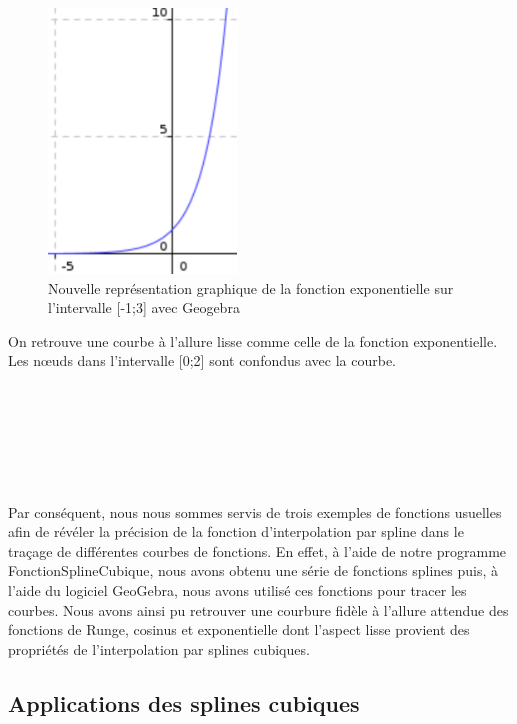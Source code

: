 \documentclass{article}
\begin{document}
\begin{figure}[h]
	\centering
	\includegraphics[width=5cm]{FonctionExponentielle.png}
	\caption{Nouvelle repr\'{e}sentation graphique de la fonction exponentielle sur l'intervalle [-1;3] avec Geogebra}
\end{figure}

\newpage

On retrouve une courbe \`a l'allure lisse comme celle de la fonction exponentielle. Les n\oe uds dans l'intervalle [0;2] sont confondus avec la courbe.\\\\\\\\\\\\\

Par cons\'{e}quent, nous nous sommes servis de trois exemples de fonctions usuelles afin de r\'{e}v\'{e}ler la pr\'{e}cision de la fonction d'interpolation par spline dans le tra\c cage de diff\'{e}rentes courbes de fonctions. En effet, \`a l'aide de notre programme FonctionSplineCubique, nous avons obtenu une s\'{e}rie de fonctions splines puis, \`a l'aide du logiciel GeoGebra, nous avons utilis\'{e} ces fonctions pour tracer les courbes. Nous avons ainsi pu retrouver une courbure fid\`{e}le \`a l'allure attendue des fonctions de Runge, cosinus et exponentielle dont l'aspect lisse provient des propri\'{e}t\'{e}s de l'interpolation par splines cubiques.\\

\newpage

\begin{huge}
\section{Applications des splines cubiques}
\end{huge}
\end{document}
